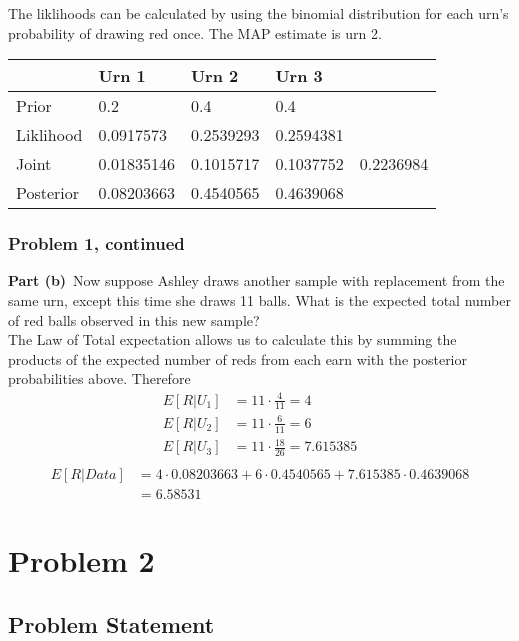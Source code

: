 \documentclass[12pt]{article}
\theoremstyle{definition}
\begin{document}
The liklihoods can be calculated by using the binomial distribution for each urn's probability of drawing red once. The MAP estimate is urn 2.\\

\begin{tabular}{lllll}
          & Urn 1      & Urn 2     & Urn 3     &           \\
\hline
Prior     & 0.2        & 0.4       & 0.4       &           \\
Liklihood & 0.0917573  & 0.2539293 & 0.2594381 &           \\
Joint     & 0.01835146 & 0.1015717 & 0.1037752 & 0.2236984 \\
Posterior & 0.08203663 & 0.4540565 & 0.4639068 &          \\
\hline
\end{tabular}


\newpage
\subsubsection*{Problem 1, continued}

\noindent
{\bf Part (b)}\ Now suppose Ashley draws another sample with replacement from the same urn, except this time she draws 11 balls. What is the expected total number of red balls observed in this new sample?\\

The Law of Total expectation allows us to calculate this by summing the products of the expected number of reds from each earn with the posterior probabilities above. Therefore
\begin{align*}
E[R|U_1] &= 11\cdot \frac{4}{11} = 4\\
E[R|U_2] &= 11\cdot \frac{6}{11} = 6\\
E[R|U_3] &= 11\cdot \frac{18}{26} = 7.615385\\
\end{align*}
\begin{align*}
E[R|Data] &= 4 \cdot 0.08203663 + 6 \cdot 0.4540565 + 7.615385 \cdot 0.4639068\\
&= 6.58531
\end{align*}

\newpage
\section*{Problem 2}

\subsection*{Problem Statement}
\end{document}
